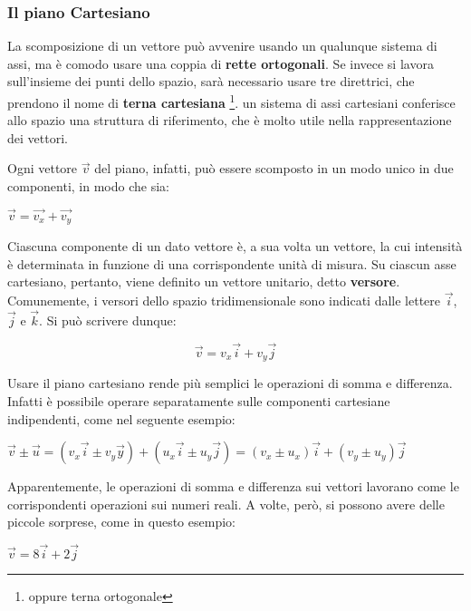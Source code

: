 \subsubsection*{Il piano Cartesiano}

La scomposizione di un vettore può avvenire usando un qualunque sistema di assi, ma è comodo usare una coppia di {\bfseries rette ortogonali}. Se invece si lavora sull'insieme dei punti dello spazio, sarà necessario usare tre direttrici, che prendono il nome di {\bfseries terna cartesiana} \footnote{oppure terna ortogonale}.\newline
un sistema di assi cartesiani conferisce allo spazio una struttura di riferimento, che è molto utile nella rappresentazione dei vettori.
 
Ogni vettore $ \vec{v}$ del piano, infatti, può essere scomposto in un modo unico in due componenti, in modo che sia:
\begin{center}
\begin{math}
\vec {v} = \vec{v_x} + \vec{v_y}
\end{math}
\end{center}
Ciascuna componente di un dato vettore è, a sua volta un vettore, la cui intensità è determinata in funzione di una corrispondente unità di misura.\newline
Su ciascun asse cartesiano, pertanto, viene definito un vettore unitario, detto {\bfseries versore}.
Comunemente, i versori dello spazio tridimensionale sono indicati dalle lettere
$\vec i$,$\vec j$ e ${\vec k}$. Si può scrivere dunque:
\begin{center}
\begin{equation}\label{eq:scomposizioneDiUnVettore}
\vec v = v_x \vec i + v_y \vec j
\end{equation}
\end{center}

Usare il piano cartesiano rende più semplici le operazioni di somma e differenza. Infatti è possibile operare separatamente sulle componenti cartesiane indipendenti, come nel seguente esempio:
\begin {center}
\begin{math}
\vec v \pm \vec u = (v_x \vec i \pm v_y \vec y) + (u_x \vec i \pm u_y \vec j) = (v_x \pm u_x) \vec i + (v_y \pm u_y) \vec j
\end{math}
\end{center}

Apparentemente, le operazioni di somma e differenza sui vettori lavorano come le corrispondenti operazioni sui numeri reali.\newline
A volte, però, si possono avere delle piccole sorprese, come in questo esempio:
\begin {center}
\begin {math}
\vec v = 8 \vec i + 2 \vec j
\end{math}
\end{center}

